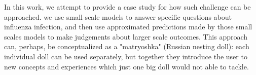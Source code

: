 In this work, we attempt to provide a case study for how such challenge can be approached. we use small scale models to answer specific questions about influenza infection, and then use approximated predictions made by those small scales models to make judgements about larger scale outcomes. This approach can, perhaps, be conceptualized as a "matryoshka" (Russian nesting doll): each individual doll can be used separately, but together they introduce the user to new concepts and experiences which just one big doll would not able to tackle.

















%